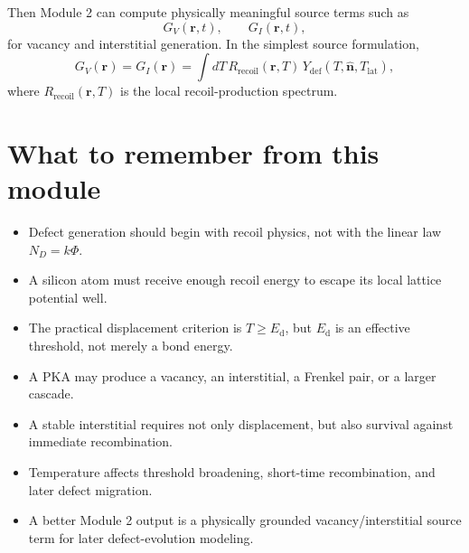 \documentclass[11pt]{article}
\newcommand{\Ed}{E_{\mathrm d}}
\newcommand{\Tlat}{T_{\mathrm{lat}}}
\newcommand{\Ydef}{Y_{\mathrm{def}}}
\begin{document}
Then Module 2 can compute physically meaningful source terms such as
\begin{equation}
G_V(\mathbf r,t), \qquad G_I(\mathbf r,t),
\end{equation}
for vacancy and interstitial generation. In the simplest source formulation,
\begin{equation}
G_V(\mathbf r) = G_I(\mathbf r) = \int dT\, R_{\mathrm{recoil}}(\mathbf r,T)\,\Ydef(T,\hat{\mathbf n},\Tlat),
\end{equation}
where $R_{\mathrm{recoil}}(\mathbf r,T)$ is the local recoil-production spectrum.

\section{What to remember from this module}

\begin{itemize}
    \item Defect generation should begin with recoil physics, not with the linear law $N_D = k\Phi$.
    \item A silicon atom must receive enough recoil energy to escape its local lattice potential well.
    \item The practical displacement criterion is $T \ge \Ed$, but $\Ed$ is an effective threshold, not merely a bond energy.
    \item A PKA may produce a vacancy, an interstitial, a Frenkel pair, or a larger cascade.
    \item A stable interstitial requires not only displacement, but also survival against immediate recombination.
    \item Temperature affects threshold broadening, short-time recombination, and later defect migration.
    \item A better Module 2 output is a physically grounded vacancy/interstitial source term for later defect-evolution modeling.
\end{itemize}
\end{document}

